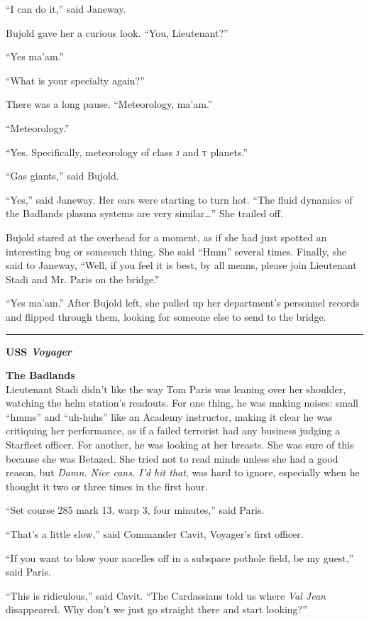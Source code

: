 \documentclass[twoside,letterpaper,12pt]{memoir}
\begin{document}
``I can do it,'' said Janeway.

Bujold gave her a curious look. ``You, Lieutenant?''

``Yes ma'am.''

``What is your specialty again?''

There was a long pause. ``Meteorology, ma'am.''

``Meteorology.''

``Yes. Specifically, meteorology of class \textsc{j} and \textsc{t} planets.''

``Gas giants,'' said Bujold.

``Yes,'' said Janeway. Her ears were starting to turn hot. ``The fluid dynamics of the Badlands plasma systems are very similar\ldots '' She trailed off.

Bujold stared at the overhead for a moment, as if she had just spotted an interesting bug or somesuch thing. She said ``Hmm'' several times. Finally, she said to Janeway, ``Well, if you feel it is best, by all means, please join Lieutenant Stadi and Mr. Paris on the bridge.''

``Yes ma'am.'' After Bujold left, she pulled up her department's personnel records and flipped through them, looking for someone else to send to the bridge.

\fancybreak{\rule{3cm}{0.4 pt}}
\noindent\textbf{USS \textit{Voyager}}

\noindent\textbf{The Badlands}\\

Lieutenant Stadi didn't like the way Tom Paris was leaning over her shoulder, watching the helm station's readouts. For one thing, he was making noises: small ``hmms'' and ``uh-huhs'' like an Academy instructor, making it clear he was critiquing her performance, as if a failed terrorist had any business judging a Starfleet officer. For another, he was looking at her breasts. She was sure of this because she was Betazed. She tried not to read minds unless she had a good reason, but \textit{Damn. Nice cans. I'd hit that}, was hard to ignore, especially when he thought it two or three times in the first hour.

``Set course 285 mark 13, warp 3, four minutes,'' said Paris.

``That's a little slow,'' said Commander Cavit, Voyager's first officer.

``If you want to blow your nacelles off in a subspace pothole field, be my guest,'' said Paris.

``This is ridiculous,'' said Cavit. ``The Cardassians told us where \textit{Val Jean} disappeared. Why don't we just go straight there and start looking?''
\end{document}
